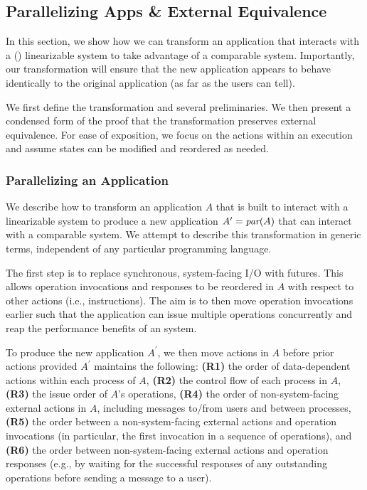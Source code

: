 \subsection{Parallelizing Apps \& External Equivalence}
\label{sec:mdl:equivalence}

In this section, we show how we can transform an application that interacts with
a (\singledispatch{}) linearizable system to take advantage of a comparable
\multidispatch{} system. Importantly, our transformation will ensure that the new
application appears to behave identically to the original application (as far as
the users can tell).

We first define the transformation and several preliminaries. We then
present a condensed form of the proof that the transformation preserves external
equivalence. For ease of exposition, we focus on the actions within an
execution and assume states can be modified and reordered as needed.

\subsubsection{Parallelizing an Application}
\label{sec:mdl:transform}

We describe how to transform an application $A$ that is built to
interact with a linearizable system to produce a new application
$A^\prime = \operatorname*{\textit{par}}(A)$ that can interact with a comparable \MDL{} system.
We attempt to describe this transformation in generic terms, independent of any particular programming language.

The first step is to replace synchronous, system-facing I/O with
futures. This allows operation invocations and responses
to be reordered in $A$ with respect to other actions (i.e., instructions).
The aim is to then move operation invocations earlier such that the application
can issue multiple operations concurrently and reap the performance benefits 
of an \MDL{} system.

To produce the new application $A^\prime$, we then move actions in $A$ before prior 
actions provided $A^\prime$ maintains the following:
\textbf{(R1)} the order of data-dependent actions within
each process of $A$,
\textbf{(R2)} the control flow of each process in $A$,
\textbf{(R3)} the issue order of $A$'s operations,
\textbf{(R4)} the order of non-system-facing external
actions in $A$, including messages to/from users and between processes,
\textbf{(R5)} the order between a non-system-facing external 
actions and operation invocations (in particular, the first invocation in a
sequence of operations), and
\textbf{(R6)} the order between non-system-facing external actions and operation responses (e.g., by waiting for the successful responses of any outstanding operations before sending a message to a user).

